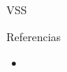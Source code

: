 \documentclass[final,t]{beamer}
\begin{document}
\begin{columns}[t]
\begin{column}{.33\linewidth}
\begin{block}{VSS}
	
	
	
	
\end{block}


% 
%



\begin{block}{Referencias}

\begin{itemize}
\item
\end{itemize}
\vspace{-0.2cm}
\end{block}

\end{column}

\end{columns}
\end{document}
